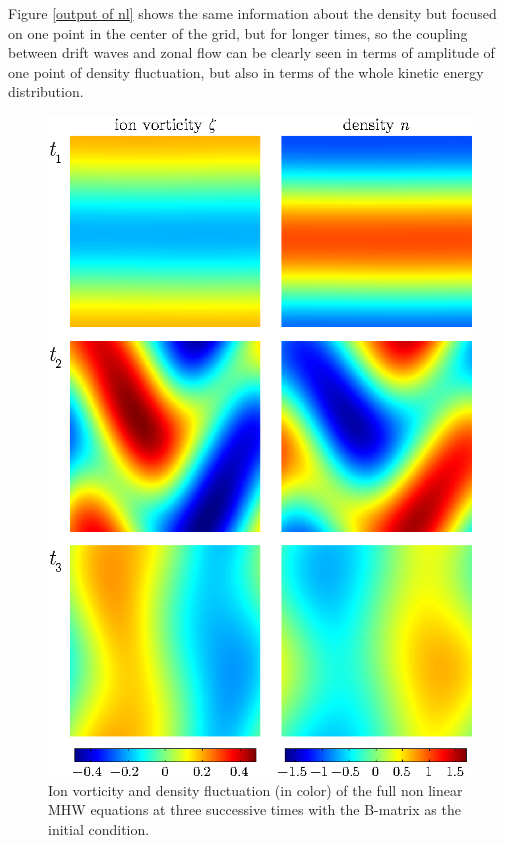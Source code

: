\documentclass[12pt,lot, lof]{puthesis}
\begin{document}
 Figure \ref{output of nl} shows the same information about the density but focused on one point in the center of the grid, but for longer times, so the coupling between drift waves and zonal flow can be clearly seen  in terms of amplitude of one point of density fluctuation, but also in terms of the whole kinetic energy distribution.
\begin{figure}[htb]
\centering
  \includegraphics[width=0.7 \linewidth]{video}
  \caption{Ion vorticity and density fluctuation (in color) of the full non linear MHW equations at three successive times with the B-matrix as the initial condition. }
\label{movie nl ol}
\end{figure}
\end{document}
